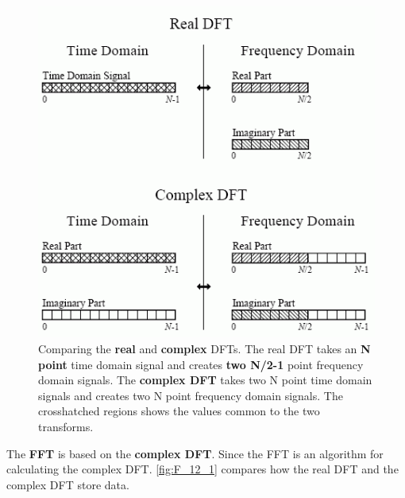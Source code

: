 \documentclass[a4paper,12pt]{article}
\begin{document}
\begin{figure}[h!]
  \label{fig:F_12_1}
  \centering
	\includegraphics[width=\textwidth, keepaspectratio=true]{F_12_1}
\caption{Comparing the \textbf{real} and \textbf{complex} DFTs.
The real DFT takes an \textbf{N point} time domain signal and creates \textbf{two N/2-1} point frequency domain signals. The \textbf{complex DFT} takes two N point time domain signals and creates two N point frequency domain signals. The crosshatched regions shows
the values common to the two transforms.}
\end{figure}


The \textbf{FFT} is based on the \textbf{complex DFT}.
Since the FFT is an algorithm for calculating the complex DFT. \autoref{fig:F_12_1} compares how the real DFT and the complex DFT store data.\\
\end{document}
